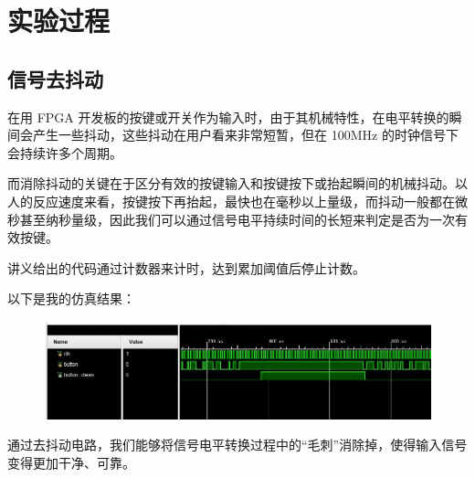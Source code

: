 \documentclass[UTF8]{article}
\begin{document}
	\section{实验过程}
	\subsection{信号去抖动}
	在用 FPGA 开发板的按键或开关作为输入时，由于其机械特性，在电平转换的瞬间会产生一些抖动，这些抖动在用户看来非常短暂，但在 100MHz 的时钟信号下会持续许多个周期。\par
	而消除抖动的关键在于区分有效的按键输入和按键按下或抬起瞬间的机械抖动。以人的反应速度来看，按键按下再抬起，最快也在毫秒以上量级，而抖动一般都在微秒甚至纳秒量级，因此我们可以通过信号电平持续时间的长短来判定是否为一次有效按键。\par
	讲义给出的代码通过计数器来计时，达到累加阈值后停止计数。\par
	以下是我的仿真结果：\par
	\begin{figure}[H]
		\centering
		\includegraphics[width=1\linewidth]{s1_1.jpg}
		\label{s1_1}
	\end{figure}\par
	通过去抖动电路，我们能够将信号电平转换过程中的“毛刺”消除掉，使得输入信号变得更加干净、可靠。\par
\end{document}
